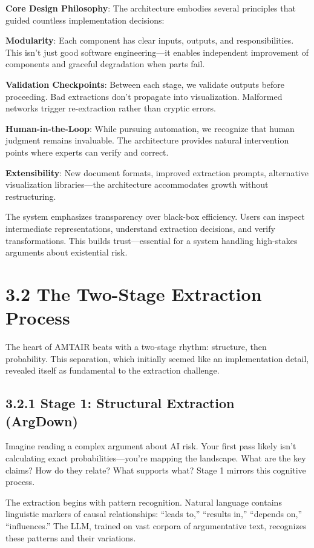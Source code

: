 \documentclass[
  11pt,
  letterpaper,
]{book}
\begin{document}
\textbf{Core Design Philosophy}: The architecture embodies several
principles that guided countless implementation decisions:

\textbf{Modularity}: Each component has clear inputs, outputs, and
responsibilities. This isn't just good software engineering---it enables
independent improvement of components and graceful degradation when
parts fail.

\textbf{Validation Checkpoints}: Between each stage, we validate outputs
before proceeding. Bad extractions don't propagate into visualization.
Malformed networks trigger re-extraction rather than cryptic errors.

\textbf{Human-in-the-Loop}: While pursuing automation, we recognize that
human judgment remains invaluable. The architecture provides natural
intervention points where experts can verify and correct.

\textbf{Extensibility}: New document formats, improved extraction
prompts, alternative visualization libraries---the architecture
accommodates growth without restructuring.

The system emphasizes transparency over black-box efficiency. Users can
inspect intermediate representations, understand extraction decisions,
and verify transformations. This builds trust---essential for a system
handling high-stakes arguments about existential risk.

\section{3.2 The Two-Stage Extraction
Process}\label{sec-two-stage-extraction}

The heart of AMTAIR beats with a two-stage rhythm: structure, then
probability. This separation, which initially seemed like an
implementation detail, revealed itself as fundamental to the extraction
challenge.

\subsection{3.2.1 Stage 1: Structural Extraction
(ArgDown)}\label{sec-stage1-argdown}

Imagine reading a complex argument about AI risk. Your first pass likely
isn't calculating exact probabilities---you're mapping the landscape.
What are the key claims? How do they relate? What supports what? Stage 1
mirrors this cognitive process.

The extraction begins with pattern recognition. Natural language
contains linguistic markers of causal relationships: ``leads to,''
``results in,'' ``depends on,'' ``influences.'' The LLM, trained on vast
corpora of argumentative text, recognizes these patterns and their
variations.
\end{document}
